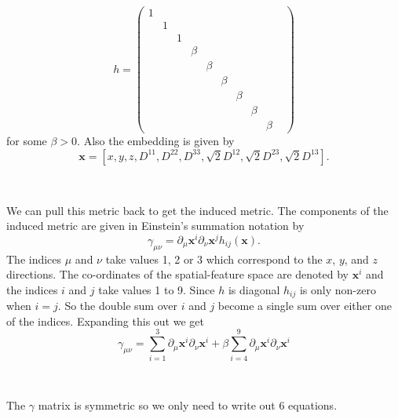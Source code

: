 \documentclass[12pt]{article}
\newcommand{\vect}[1]{\mathbf{#1}}
\begin{document}
$$
h = 
\begin{pmatrix}
1 & & & & & & & & \\
 & 1 & & & & & & & \\
 & & 1 & & & & & & \\
 & & & \beta & & & & & \\
 & & & & \beta & & & & \\
 & & & & & \beta & & & \\
 & & & & & & \beta & & \\
 & & & & & & & \beta & \\
 & & & & & & & & \beta & 
\end{pmatrix}
$$
for some $\beta > 0$. Also the embedding is given by 
$$ \vect{x} = [x, y, z, D^{1 1}, D^{2 2}, D^{3 3}, \sqrt{2} D^{1 2}, \sqrt{2}
D^{2 3}, \sqrt{2} D^{1 3}].$$


\ 

\noindent
We can pull this metric back to get the induced metric. The components of the
induced metric are given in Einstein's summation notation by $$ \gamma_{\mu
\nu} = \partial_\mu \vect{x}^i \partial_\nu \vect{x}^j h_{ij}(\vect{x}).$$ The
indices $\mu$ and $\nu$ take values 1, 2 or 3 which correspond to the $x$, $y$,
and $z$ directions. The co-ordinates of the spatial-feature space are denoted
by $\vect{x}^i$ and the indices $i$ and $j$ take values 1 to 9.  Since $h$ is
diagonal $h_{i j}$ is only non-zero when $i = j$. So the double sum over $i$
and $j$ become a single sum over either one of the indices.  Expanding this out
we get 
$$\gamma_{\mu \nu} = 
\sum_{i=1}^3 \partial_\mu \vect{x}^i \partial_\nu \vect{x}^i + 
\beta \sum_{i=4}^9 \partial_\mu \vect{x}^i \partial_\nu \vect{x}^i$$

\ 

\noindent
The $\gamma$ matrix is symmetric so we only need to write out 6 equations. 
\end{document}

